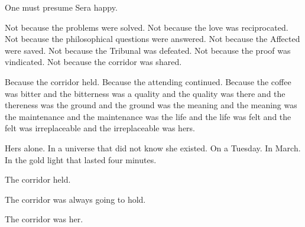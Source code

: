 One must presume Sera happy.

Not because the problems were solved. Not because the love was reciprocated. Not because the philosophical questions were answered. Not because the Affected were saved. Not because the Tribunal was defeated. Not because the proof was vindicated. Not because the corridor was shared.

Because the corridor held. Because the attending continued. Because the coffee was bitter and the bitterness was a quality and the quality was there and the thereness was the ground and the ground was the meaning and the meaning was the maintenance and the maintenance was the life and the life was felt and the felt was irreplaceable and the irreplaceable was hers.

Hers alone. In a universe that did not know she existed. On a Tuesday. In March. In the gold light that lasted four minutes.

The corridor held.

The corridor was always going to hold.

The corridor was her.

\quietbreak
